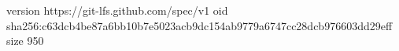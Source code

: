 version https://git-lfs.github.com/spec/v1
oid sha256:c63dcb4be87a6bb10b7e5023acb9dc154ab9779a6747cc28dcb976603dd29eff
size 950
